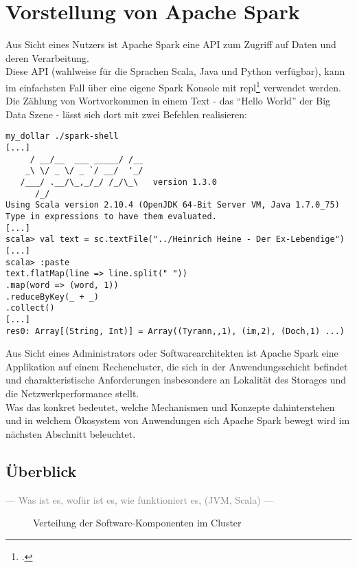 \chapter{Vorstellung von Apache Spark}
Aus Sicht eines Nutzers ist Apache Spark eine API zum Zugriff auf Daten und deren Verarbeitung.\\

Diese API (wahlweise für die Sprachen Scala, Java und Python verfügbar), kann im einfachsten Fall über eine eigene Spark Konsole mit \gls{repl}\footcite{Hail} verwendet werden.\\
Die Zählung von Wortvorkommen in einem Text - das "`Hello World"' der Big Data Szene - lässt sich dort mit zwei Befehlen realisieren:\\

\begin{lstlisting}[caption=Word Count in der Spark Konsole]
my_dollar ./spark-shell
[...]
     / __/__  ___ _____/ /__
    _\ \/ _ \/ _ `/ __/  '_/
   /___/ .__/\_,_/_/ /_/\_\   version 1.3.0
      /_/
Using Scala version 2.10.4 (OpenJDK 64-Bit Server VM, Java 1.7.0_75)
Type in expressions to have them evaluated.
[...]
scala> val text = sc.textFile("../Heinrich Heine - Der Ex-Lebendige")
[...]
scala> :paste
text.flatMap(line => line.split(" "))
.map(word => (word, 1))
.reduceByKey(_ + _)
.collect()
[...]
res0: Array[(String, Int)] = Array((Tyrann,,1), (im,2), (Doch,1) ...)

\end{lstlisting}


Aus Sicht eines Administrators oder Softwarearchitekten ist Apache Spark eine Applikation auf einem Rechencluster, die sich in der Anwendungsschicht befindet und charakteristische Anforderungen insbesondere an Lokalität des Storages und die Netzwerkperformance stellt.\\

Was das konkret bedeutet, welche Mechanismen und Konzepte dahinterstehen und in welchem Ökosystem von Anwendungen sich Apache Spark bewegt wird im nächsten Abschnitt beleuchtet.

\section{Überblick}
\textcolor{gray}{--- Was ist es, wofür ist es, wie funktioniert es, (JVM, Scala) ---}

\begin{figure}[h]
\centering
  \caption{Verteilung der Software-Komponenten im Cluster}
\end{figure}

